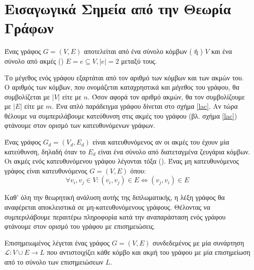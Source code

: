 \section{Εισαγωγικά Σημεία από την Θεωρία Γράφων}
\begin{definition}[Γράφος]
Ένας γράφος $G = (V, E)$ αποτελείται από ένα σύνολο κόμβων ( ή ) $V$ και ένα σύνολο από ακμές () $E = {e \subseteq V, |e|=2}$ μεταξύ τους.
\end{definition}
Το μέγεθος ενός γράφου εξαρτάται από τον αριθμό των κόμβων και των ακμών του.
Ο αριθμός των κόμβων, που ονομάζεται καταχρηστικά και \textit{μέγεθος} του γράφου, θα συμβολίζεται με $|V|$ είτε με $n$.
Όσον αφορά τον αριθμό ακμών, θα τον συμβολίζουμε με $|E|$ είτε με $m$.
Ένα απλό παράδειγμα γράφου δίνεται στο σχήμα \ref{lac}.
Αν τώρα θέλουμε να συμπεριλάβουμε κατεύθυνση στις ακμές του γράφου (βλ. σχήμα \ref{lac}) φτάνουμε στον ορισμό των κατευθυνόμενων γράφων.
\begin{definition}
Ένας γράφος $G_{d} = (V_{d}, E_{d})$ είναι κατευθυνόμενος αν οι ακμές του έχουν μία κατεύθυνση, δηλαδή όταν το $E_{d}$ είναι ένα σύνολο από διατεταγμένα ζευγάρια κόμβων.
Οι ακμές ενός κατευθυνόμενου γράφου λέγονται τόξα ().
Ένας μη κατευθυνόμενος γράφος είναι κατευθυνόμενος $G = ( V, E )$ όπου:
$$\forall v_{i}, v_{j} \in V: (v_{i}, v_{j}) \in E \Leftrightarrow (v_{j}, v_{i}) \in E$$
\end{definition}
Καθ' όλη την θεωρητική ανάλυση αυτής της διπλωματικής, η λέξη γράφος θα αναφέρεται αποκλειστικά σε μη-κατευθυνόμενους γράφους.
Θέλοντας να συμπεριλάβουμε περαιτέρω πληροφορία κατά την αναπαράσταση ενός γράφου φτάνουμε στον ορισμό του γράφου με επισημειώσεις.
\begin{definition}
Επισημειωμένος λέγεται ένας γράφος $G = ( V, E )$ συνδεδεμένος με μία συνάρτηση $\mathcal{L} : V \cup E \to L$ που αντιστοιχίζει κάθε κόμβο και ακμή του γράφου με μία επισημείωση από το σύνολο των επισημειώσεων $L$.
\label{def:labeled_graphs}
\end{definition}

